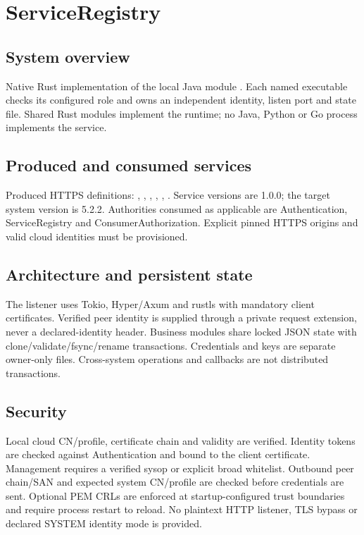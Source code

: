 \documentclass[a4paper]{arrowhead}
\begin{document}
\ArrowheadSetup
\section{ServiceRegistry}
\subsection{System overview}
Native Rust implementation of the local Java module . Each named executable checks its configured role and owns an independent identity, listen port and state file. Shared Rust modules implement the runtime; no Java, Python or Go process implements the service.
\subsection{Produced and consumed services}
Produced HTTPS definitions: , \allowbreak {}, \allowbreak {}, \allowbreak {}, \allowbreak {}, \allowbreak {}. Service versions are 1.0.0; the target system version is 5.2.2. Authorities consumed as applicable are Authentication, ServiceRegistry and ConsumerAuthorization. Explicit pinned HTTPS origins and valid cloud identities must be provisioned.
\subsection{Architecture and persistent state}
The listener uses Tokio, Hyper/Axum and rustls with mandatory client certificates. Verified peer identity is supplied through a private request extension, never a declared-identity header. Business modules share locked JSON state with clone/validate/fsync/rename transactions. Credentials and keys are separate owner-only files. Cross-system operations and callbacks are not distributed transactions.
\subsection{Security}
Local cloud CN/profile, certificate chain and validity are verified. Identity tokens are checked against Authentication and bound to the client certificate. Management requires a verified sysop or explicit broad whitelist. Outbound peer chain/SAN and expected system CN/profile are checked before credentials are sent. Optional PEM CRLs are enforced at startup-configured trust boundaries and require process restart to reload. No plaintext HTTP listener, TLS bypass or declared SYSTEM identity mode is provided.
\end{document}
